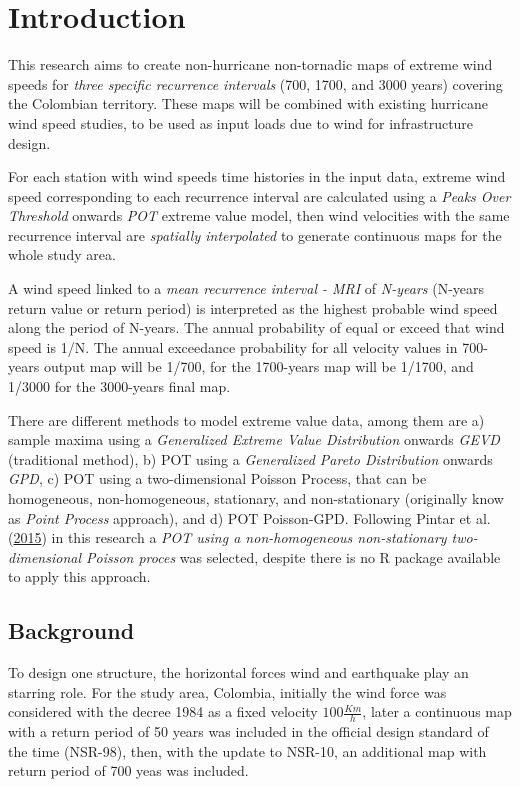 \documentclass[12pt,oneside]{reedthesis}
\begin{document}
\hypertarget{introduction}{%
\chapter{Introduction}\label{introduction}}

This research aims to create non-hurricane non-tornadic maps of extreme wind speeds for \emph{three specific recurrence intervals} (700, 1700, and 3000 years) covering the Colombian territory. These maps will be combined with existing hurricane wind speed studies, to be used as input loads due to wind for infrastructure design.

For each station with wind speeds time histories in the input data, extreme wind speed corresponding to each recurrence interval are calculated using a \emph{Peaks Over Threshold} onwards \emph{POT} extreme value model, then wind velocities with the same recurrence interval are \emph{spatially interpolated} to generate continuous maps for the whole study area.

A wind speed linked to a \emph{mean recurrence interval - MRI} of \emph{N-years} (N-years return value or return period) is interpreted as the highest probable wind speed along the period of N-years. The annual probability of equal or exceed that wind speed is 1/N. The annual exceedance probability for all velocity values in 700-years output map will be 1/700, for the 1700-years map will be 1/1700, and 1/3000 for the 3000-years final map.

There are different methods to model extreme value data, among them are a) sample maxima using a \emph{Generalized Extreme Value Distribution} onwards \emph{GEVD} (traditional method), b) POT using a \emph{Generalized Pareto Distribution} onwards \emph{GPD}, c) POT using a two-dimensional Poisson Process, that can be homogeneous, non-homogeneous, stationary, and non-stationary (originally know as \emph{Point Process} approach), and d) POT Poisson-GPD. Following Pintar et al. (\protect\hyperlink{ref-Pintar2015}{2015}) in this research a \emph{POT using a non-homogeneous non-stationary two-dimensional Poisson proces} was selected, despite there is no R package available to apply this approach.

\hypertarget{background}{%
\section{Background}\label{background}}

To design one structure, the horizontal forces wind and earthquake play an starring role. For the study area, Colombia, initially the wind force was considered with the decree 1984 as a fixed velocity \(100 \frac{Km}{h}\), later a continuous map with a return period of 50 years was included in the official design standard of the time (NSR-98), then, with the update to NSR-10, an additional map with return period of 700 yeas was included.
\end{document}
